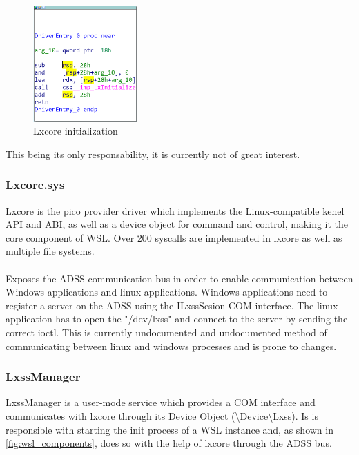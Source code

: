             \begin{figure}[H]
                \centering
                \includegraphics[width=150px, keepaspectratio]{img/lxss.png}
                \caption{Lxcore initialization}
                \label{fig:lxss}
            \end{figure}

            This being its only responsability, it is currently not of great interest.
            
            \subsubsection{Lxcore.sys}
            Lxcore is the pico provider driver which implements the Linux-compatible kenel API and ABI, as well as a device object for command
            and control\cite{Bluehat2016AI}, making it the core component of WSL. Over 200 syscalls are implemented in lxcore as well as
            multiple file systems.

            \paragraph{}
            Exposes the ADSS communication bus in order to enable communication between Windows applications and linux applications. Windows
            applications need to register a server on the ADSS using the ILxssSesion COM interface. The linux application has to open the
            "/dev/lxss" and connect to the server by sending the correct ioctl. This is currently undocumented and undocumented
            method of communicating between linux and windows processes and is prone to changes.

            \subsubsection{LxssManager}
            LxssManager is a user-mode service which provides a COM interface and communicates with lxcore through its Device Object
            (\textbackslash Device\textbackslash Lxss). Is is responsible with starting the init process of a WSL instance and, as shown
            in \ref{fig:wsl_components}, does so with the help of lxcore through the ADSS bus.

